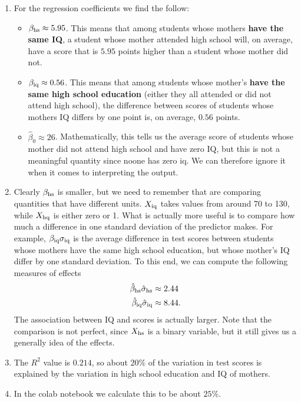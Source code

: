 \begin{example}
\begin{Verbatim}
\end{Verbatim}
\vspace{1cm}
\begin{enumerate}[label=(\alph*)]
\item For the regression coefficients we find the follow:
\begin{itemize}
\item $\beta_{\rm hs} \approx 5.95$. This means that among students whose mothers {\bf have the same IQ}, a student whose mother attended high school will, on average, have a score that is $5.95$ points higher than a student whose mother did not. 
\item $\beta_{\rm iq} \approx 0.56$. This means that among students whose mother's {\bf have the same high school education} (either they all attended or did not attend high school), the difference between scores of students whose mothers IQ differs by one point is, on average, $0.56$ points.
\item $\hat{\beta}_0 \approx 26$. Mathematically, this tells us the average score of students whose mother did not attend high school and have zero IQ, but this is not a meaningful quantity since noone has zero iq. We can therefore ignore it when it comes to interpreting the output. 
\end{itemize}
\item Clearly $\beta_{\rm hs}$ is smaller, but we need to remember that are comparing quantities that have different units. $X_{\rm iq}$ takes values from around 70 to 130, while $X_{\rm hq}$ is either zero or 1. What is actually more useful is to compare how much a difference in one standard deviation of the predictor makes. For example, $\beta_{\rm iq}\sigma_{\rm iq}$ is the average difference in test scores between students whose mothers have the same high school education, but whose mother's IQ differ by one standard deviation. To this end, we can compute the following measures of effects
\begin{align*}
\hat{\beta}_{\rm hs}\hat{\sigma}_{\rm hs} &\approx 2.44\\
\hat{\beta}_{\rm iq}\hat{\sigma}_{\rm iq} &\approx 8.44.
\end{align*}
The association between IQ and scores is actually larger. Note that the comparison is not perfect, since $X_{\rm hs}$ is a binary variable, but it still gives us a generally idea of the effects. \\
\item The $R^2$ value is $0.214$, so about $20\%$ of the variation in test scores is explained by the variation in high school education and IQ of mothers. 
\item In the colab notebook we calculate this to be about $25\%$. 
\end{enumerate}
\end{example}

